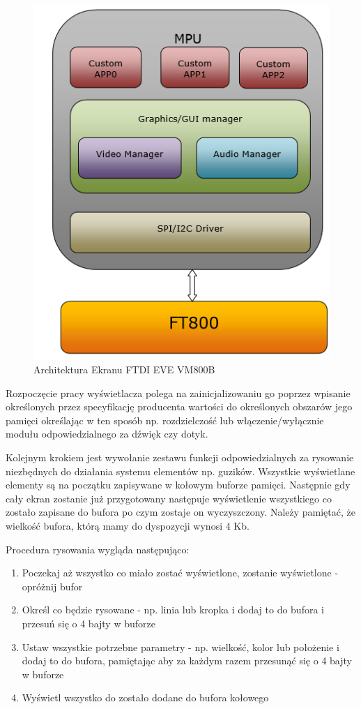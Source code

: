 \documentclass{xmgr}
\begin{document}
\begin{figure}[!h]
    \centering
    \includegraphics[height=0.3\textheight]{images/FTDIarchitecture.png}
    \caption{Architektura Ekranu FTDI EVE VM800B}
\end{figure}

Rozpoczęcie pracy wyświetlacza polega na zainicjalizowaniu go poprzez wpisanie określonych przez specyfikację producenta wartości do określonych obszarów jego pamięci określając w ten sposób np. rozdzielczość lub włączenie/wyłącznie modułu odpowiedzialnego za dźwięk czy dotyk. 

Kolejnym krokiem jest wywołanie zestawu funkcji odpowiedzialnych za rysowanie niezbędnych do działania systemu elementów np. guzików. Wszystkie wyświetlane elementy są na początku zapisywane w kołowym buforze pamięci. Następnie gdy cały ekran zostanie już przygotowany następuje wyświetlenie wszystkiego co zostało zapisane do bufora po czym zostaje on wyczyszczony. Należy pamiętać, że wielkość bufora, którą mamy do dyspozycji wynosi 4 Kb.

Procedura rysowania wygląda następująco:
\begin{enumerate}
	\item Poczekaj aż wszystko co miało zostać wyświetlone, zostanie wyświetlone - opróżnij bufor
	\item Określ co będzie rysowane - np. linia lub kropka i dodaj to do bufora i przesuń się o 4 bajty w buforze
	\item Ustaw wszystkie potrzebne parametry - np. wielkość, kolor lub położenie i dodaj to do bufora, pamiętając aby za każdym razem przesunąć się o 4 bajty w buforze
	\item Wyświetl wszystko do zostało dodane do bufora kołowego 
\end{enumerate}
\end{document}
